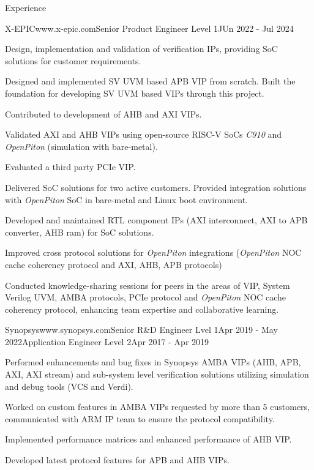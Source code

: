 \documentclass[
11pt, %
]{./assets/resume} %
\begin{document}
\begin{rSection}{Experience}
	\begin{rSubsectionX}{X-EPIC}{www.x-epic.com}{Senior Product Engineer Level 1}{JUn 2022 - Jul 2024}
		\item Design, implementation and validation of verification IPs, providing SoC solutions for customer requirements.
		\item Designed and implemented SV UVM based APB VIP from scratch. Built the foundation for developing SV UVM based VIPs through this project.
		\item Contributed to development of AHB and AXI VIPs.
		\item Validated AXI and AHB VIPs using open-source RISC-V SoCs \textit{C910} and \textit{OpenPiton} (simulation with bare-metal).
		\item Evaluated a third party PCIe VIP.
		\item Delivered SoC solutions for two active customers. Provided integration solutions with \textit{OpenPiton} SoC in bare-metal and Linux boot environment.
		\item Developed and maintained RTL component IPs (AXI interconnect, AXI to APB converter, AHB ram) for SoC solutions.
		\item Improved cross protocol solutions for \textit{OpenPiton} integrations (\textit{OpenPiton} NOC cache coherency protocol and AXI, AHB, APB protocols)
		\item Conducted knowledge-sharing sessions for peers in the areas of VIP, System Verilog UVM, AMBA protocols, PCIe protocol and \textit{OpenPiton} NOC cache coherency protocol, enhancing team expertise and collaborative learning.
	\end{rSubsectionX}
	\begin{rSubsectionM}{Synopsys}{www.synopsys.com}{Senior R\&D Engineer Lvel 1}{Apr 2019 - May 2022}{Application Engineer Level 2}{Apr 2017 - Apr 2019}{}{}
		\item Performed enhancements and bug fixes in Synopsys AMBA VIPs (AHB, APB, AXI, AXI stream) and sub-system level verification solutions utilizing simulation and debug tools (VCS and Verdi).
		\item Worked on custom features in AMBA VIPs requested by more than 5 customers, communicated with ARM IP team to ensure the protocol compatibility.
		\item Implemented performance matrices and enhanced performance of AHB VIP.
		\item Developed latest protocol features for APB and AHB VIPs.

\end{rSubsectionM}
\end{rSection}
\end{document}
